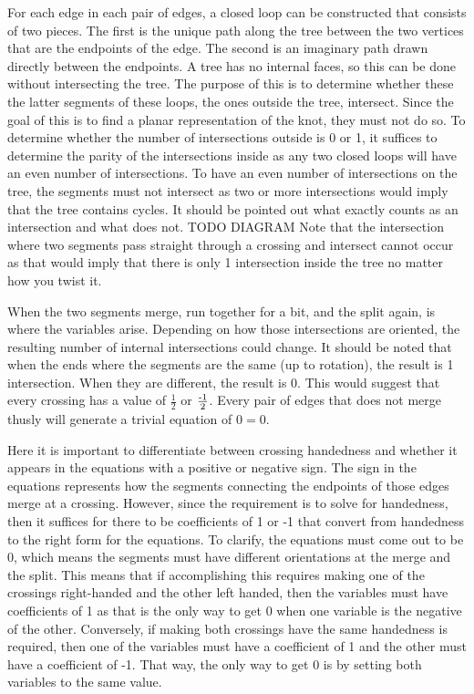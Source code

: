 \begin{paper}
For each edge in each pair of edges, a closed loop can be constructed that
consists of two pieces.
The first is the unique path along the tree between the two vertices that are
the endpoints of the edge.
The second is an imaginary path drawn directly between the endpoints.
A tree has no internal faces, so this can be done without intersecting the tree.
The purpose of this is to determine whether these the latter segments of these
loops, the ones outside the tree, intersect.
Since the goal of this is to find a planar representation of the knot, they must
not do so.
To determine whether the number of intersections outside is 0 or 1, it suffices
to determine the parity of the intersections inside as any two closed loops will
have an even number of intersections.
To have an even number of intersections on the tree, the segments must not
intersect as two or more intersections would imply that the tree contains
cycles.
It should be pointed out what exactly counts as an intersection and what does
not. TODO DIAGRAM
Note that the intersection where two segments pass straight through a crossing
and intersect cannot occur as that would imply that there is only 1 intersection
inside the tree no matter how you twist it.

When the two segments merge, run together for a bit, and the split again, is
where the variables arise.
Depending on how those intersections are oriented, the resulting number of
internal intersections could change.
It should be noted that when the ends where the segments are the same (up to
rotation), the result is 1 intersection.
When they are different, the result is 0.
This would suggest that every crossing has a value of $\frac12$ or
$\frac{\text-1}2$.
Every pair of edges that does not merge thusly will generate a trivial equation
of $0=0$.

Here it is important to differentiate between crossing handedness and whether it
appears in the equations with a positive or negative sign.
The sign in the equations represents how the segments connecting the endpoints
of those edges merge at a crossing.
However, since the requirement is to solve for handedness, then it suffices for
there to be coefficients of 1 or -1 that convert from handedness to the right
form for the equations.
To clarify, the equations must come out to be 0, which means the segments must
have different orientations at the merge and the split.
This means that if accomplishing this requires making one of the crossings
right-handed and the other left handed, then the variables must have
coefficients of 1 as that is the only way to get 0 when one variable is the
negative of the other.
Conversely, if making both crossings have the same handedness is required, then
one of the variables must have a coefficient of 1 and the other must have a
coefficient of -1.
That way, the only way to get 0 is by setting both variables to the same value.


\end{paper}
